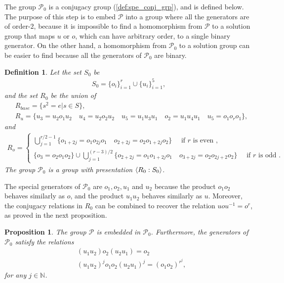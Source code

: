 \documentclass[11pt,letterpaper]{article}
\DeclarePairedDelimiter{\ip}{\langle}{\rangle}
\newcommand{\N}{\mathbb{N}}
\newcommand{\1}{\mathbb{1}}
\newcommand{\Pg}{\mathcal{P}}
\newtheorem{proposition}[theorem]{Proposition}
\newtheorem{definition}[theorem]{Definition}
\theoremstyle{definition}
\begin{document}
The group $\Pg_0$ is a conjugacy group (\cref{def:spe_conj_grp}), and is defined below.
The purpose of this step is to embed $\Pg$ into a group where all the
generators are of order-$2$, because
it is impossible to find a homomorphism from $\Pg$ to a solution group that maps $u$ or $o$, which can have arbitrary order, to a single binary generator. 
On the other hand, a homomorphism from $\Pg_0$ to a solution group can be easier to find because all the generators of $\Pg_0$ are binary.
\begin{definition}	
\label{def:g0}
	Let the set $S_0$ be 
	\begin{align*}
		S_0 = \{o_i\}_{i=1}^{r} \cup \{u_i\}_{i=1}^5,
	\end{align*}
	and the set $R_0$ be the union of 
	\begin{align*}
	&R_{base} = \{s^2 = e | s \in S\},\\
	&R_{u} = \{ u_3 = u_2o_1u_2 \quad u_4 = u_2o_2u_2 \quad 
	u_5 = u_1u_3u_1 \quad o_2 = u_1u_4u_1 \quad u_5 = o_1 o_r o_1\},
	\end{align*}
	and 
	\begin{align*}
	R_o = 
	\begin{cases} 
	\bigcup_{j=1}^{r/2-1}\{ o_{1+2j} = o_1o_{2j}o_1 \quad o_{2+2j} = o_2o_{1+2j}o_2\} \quad \text{ if $r$ is even },\\
	\{o_3 = o_2o_1o_2\} \cup \bigcup_{j=1}^{(r-3)/2}\{
	 o_{2+2j} =o_1o_{1+2j}o_1 \quad o_{3+2j} = o_2o_{2j+2}o_2 \}\quad\text{ if $r$ is odd }.
	\end{cases}
	\end{align*}
	The group $\Pg_0$ is a group with presentation $\ip{R_0:S_0}$.
\end{definition}
The special generators of $\Pg_0$ are $o_1, o_2, u_1$ and $u_2$ because the product $o_1o_2$ behaves similarly as $o$,
and the product $u_1u_2$ behaves similarly as $u$.
Moreover, the conjugacy relations in $R_0$ can be combined to recover the relation $uou^{-1} = o^r$,
as proved in the next proposition.
\begin{proposition}
    \label{prop:g0}
	The group $\Pg$ is embedded in $\Pg_0$.
	Furthermore, the generators of $\Pg_0$ satisfy the relations 
	\begin{align}
	    \label{eq:uo_comm}
	    &(u_1u_2) o_2 (u_2u_1) = o_2 \\ 
	    \label{eq:uo_rel}
		&(u_1u_2)^j o_1o_2 (u_2u_1)^j = (o_1o_2)^{r^j}, 
	\end{align}
	for any $ j \in \N$.
\end{proposition}
\end{document}
